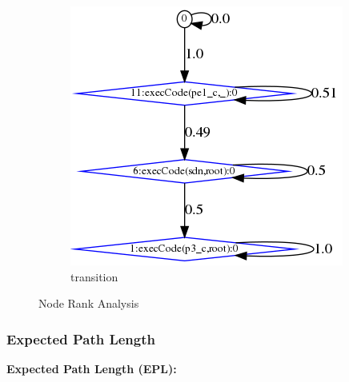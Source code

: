 \begin{figure}[H]
\begin{subfigure}{.33\textwidth}
\includegraphics[width=\linewidth]{content/chapters/ch_background/sdn_analytics/2/figs/weightedGraphs/final_007_weighEdges.png}
\caption{transition}
\label{fig:nra_fin}
\end{subfigure}%
\caption{Node Rank Analysis}
\end{figure} 

\subsubsection{Expected Path Length}\label{subsec:results:epl}
% 


\textbf{Expected Path Length (EPL):  }

